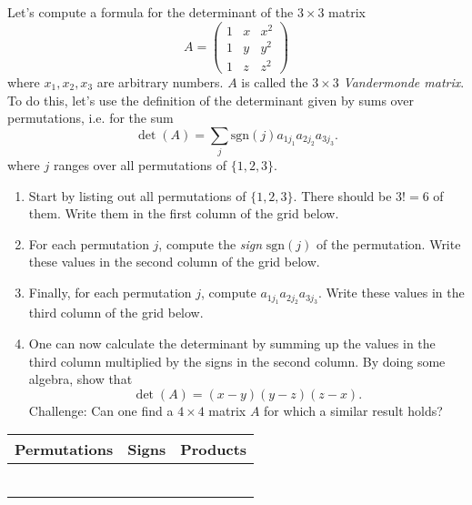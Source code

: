 \documentclass[12pt,a4paper]{article}
\theoremstyle{definition}
\begin{document}
\begin{question}
	Let's compute a formula for the determinant of the $3 \times 3$ matrix
	\[ A = \begin{pmatrix}
		1 & x & x^2\\
		1 & y & y^2\\
		1 & z & z^2
	\end{pmatrix} \]
	where $x_1,x_2,x_3$ are arbitrary numbers. $A$ is called the $3 \times 3$ \emph{Vandermonde matrix}. To do this, let's use the definition of the determinant given by sums over permutations, i.e. for the sum
	\[ \det(A) = \sum_j \text{sgn}(j) a_{1 j_1} a_{2 j_2} a_{3 j_3}. \]
	where $j$ ranges over all permutations of $\{ 1, 2, 3 \}$.
	\begin{enumerate}
		\item Start by listing out all permutations of $\{ 1, 2, 3 \}$. There should be $3! = 6$ of them. Write them in the first column of the grid below.

		\item For each permutation $j$, compute the \emph{sign} $\text{sgn}(j)$ of the permutation. Write these values in the second column of the grid below.

		\item Finally, for each permutation $j$, compute $a_{1 j_1} a_{2 j_2} a_{3 j_3}$. Write these values in the third column of the grid below.

		\item One can now calculate the determinant by summing up the values in the third column multiplied by the signs in the second column. By doing some algebra, show that
		\[ \det(A) = (x-y)(y-z)(z-x). \]
		Challenge: Can one find a $4 \times 4$ matrix $A$ for which a similar result holds?
	\end{enumerate}
	\begin{center}
	\begin{tabular}{ |c|c|c| } 
	\hline
	Permutations & Signs & Products \\
	\hline
	& &\\
	\hline 
	& &\\ 
	\hline
	& &\\ 
	\hline
	& &\\ 
	\hline
	& &\\ 
	\hline
	& &\\ 
	\hline
	\end{tabular}
	\end{center}
\end{question}
\end{document}
